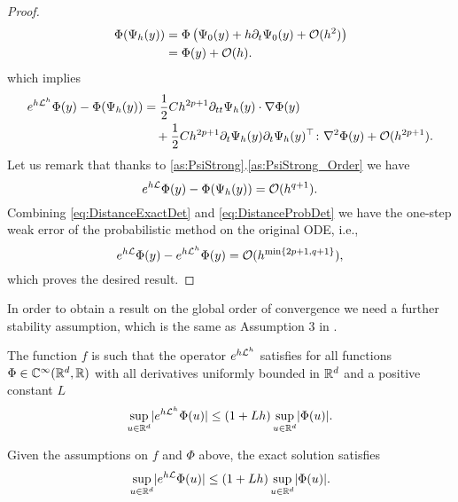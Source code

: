 \documentclass[10pt]{article}
\begin{document}
\begin{proof}
\begin{equation}
\begin{aligned}
			\Phi(\Psi_h(y)) &= \Phi\left(\Psi_0(y) + h\partial_t \Psi_0(y) + \mathcal{O}(h^2)\right) \\
			&= \Phi(y) + \mathcal{O}(h).
		\end{aligned}
	\end{equation}
	which implies
	\begin{equation}\label{eq:DistanceProbDet}
		\begin{aligned}
			e^{h\mathcal{L}^h}\Phi(y) - \Phi(\Psi_h(y)) &= \frac{1}{2} Ch^{2p+1}\partial_{tt}\Psi_h(y) \cdot \nabla\Phi(y)\\
			&\quad +\frac{1}{2}Ch^{2p+1}\partial_t \Psi_h(y) \partial_t \Psi_h(y)^\top  \colon \nabla^2\Phi(y) + \mathcal{O}(h^{2p+1}).
		\end{aligned}
	\end{equation}
	Let us remark that thanks to \cref{as:PsiStrong}.\ref{as:PsiStrong_Order} we have
	\begin{equation}\label{eq:DistanceExactDet}
		e^{h\mathcal{L}}\Phi(y) - \Phi(\Psi_h(y)) = \mathcal{O}(h^{q+1}).
	\end{equation}
	Combining \eqref{eq:DistanceExactDet} and \eqref{eq:DistanceProbDet} we have the one-step weak error of the probabilistic method on the original ODE, i.e., 
	\begin{equation}\label{eq:LocalWeakError}
		e^{h\mathcal{L}}\Phi(y) - e^{h\mathcal{L}^h}\Phi(y) = \mathcal{O}(h^{\min\{2p+1, q+1\}}),
	\end{equation}
	which proves the desired result.
\end{proof}

In order to obtain a result on the global order of convergence we need a further stability assumption, which is the same as Assumption 3 in \cite{CGS16}.

\begin{assumption}\label{as:Stability} The function $f$ is such that the operator $e^{h\mathcal{L}^h}$ satisfies for all functions $\Phi\in\mathbb{C}^{\infty}(\mathbb{R}^d, \mathbb{R})$ with all derivatives uniformly bounded in $\mathbb{R}^d$ and a positive constant $L$
	\begin{equation}
		\sup_{u\in\mathbb{R}^d} \lvert e^{h\mathcal{L}^h}\Phi(u)\rvert \leq (1 + Lh)\sup_{u\in\mathbb{R}^d}\lvert\Phi(u)\rvert.
	\end{equation}
\end{assumption}
\begin{remark} Given the assumptions on $f$ and $\Phi$ above, the exact solution satisfies
	\begin{equation}
		\sup_{u\in\mathbb{R}^d} \lvert e^{h\mathcal{L}}\Phi(u)\rvert \leq (1 + Lh)\sup_{u\in\mathbb{R}^d}\lvert\Phi(u)\rvert.
	\end{equation}
\end{remark}
\end{document}
